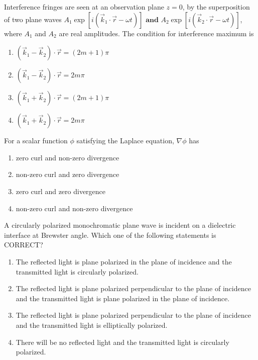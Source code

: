 \iffalse
\title{'2013-PH-(14-26)'}
\author{EE24BTECH11014 - Deepak }
\section{ph}
\chapter{2013}
\fi


    \item Interference fringes are seen at an observation plane $z=0$, by the superposition of two plane waves $
    A_1 \exp[i(\overrightarrow{k}_1 \cdot \overrightarrow{r} - \omega t)] 
  \textbf{ and }   A_2 \exp[i(\overrightarrow{k}_2 \cdot \overrightarrow{r} - \omega t)]$, where $A_1$ and $A_2$ are real amplitudes. The condition for interference maximum is 

  \begin{enumerate}
    \item $(\overrightarrow{k}_1 - \overrightarrow{k}_2) \cdot \overrightarrow{r} = (2m+1)\pi$
    \item $(\overrightarrow{k}_1 - \overrightarrow{k}_2) \cdot \overrightarrow{r} = 2m\pi$
    \item $(\overrightarrow{k}_1 + \overrightarrow{k}_2) \cdot \overrightarrow{r} = (2m+1)\pi$
    \item $(\overrightarrow{k}_1 + \overrightarrow{k}_2) \cdot \overrightarrow{r} = 2m\pi$
\end{enumerate}


\item For a scalar function $\phi$ satisfying the Laplace equation, $\nabla \phi$ has

\begin{enumerate}
    \item zero curl and non-zero divergence
    \item non-zero curl and zero divergence
    \item zero curl and zero divergence
    \item non-zero curl and non-zero divergence
\end{enumerate}

 \item A circularly polarized monochromatic plane wave is incident on a dielectric interface at Brewster angle. Which one of the following statements is CORRECT?

\begin{enumerate}
    \item The reflected light is plane polarized in the plane of incidence and the transmitted light is circularly polarized.
    \item The reflected light is plane polarized perpendicular to the plane of incidence and the transmitted light is plane polarized in the plane of incidence.
    \item The reflected light is plane polarized perpendicular to the plane of incidence and the transmitted light is elliptically polarized.
    \item There will be no reflected light and the transmitted light is circularly polarized.
\end{enumerate}

